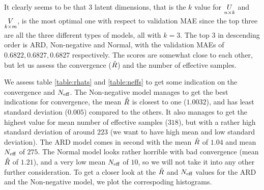 \documentclass[12pt]{article}
\begin{document}
    It clearly seems to be that $3$ latent dimensions, that is the $k$ value for $\underset{n \times k}{U}$ and $\underset{k \times m}{V}$, is the most optimal one with respect to validation MAE since the top three are all the three different types of models, all with $k=3$. The top 3 in descending order is ARD, Non-negative and Normal, with the validation MAEs of $0.6822, 0.6827, 0.6827$ respectively. The scores are somewhat close to each other, but let us assess the convergence ($\hat{R}$) and the number of effective samples. 

    \vspace{3mm}
    We assess table \ref{table:rhats} and \ref{table:neffs} to get some indication on the convergence and $N_{\text{eff}}$. The Non-negative model manages to get the best indications for convergence, the mean $\hat{R}$ is closest to one ($1.0032$), and has least standard deviation ($0.005$) compared to the others. It also manages to get the highest value for mean number of effective samples ($318$), but with a rather high standard deviation of around $223$ (we want to have high mean and low standard deviation). The ARD model comes in second with the mean $\hat{R}$ of $1.04$ and mean $N_{\text{eff}}$ of $275$. The Normal model looks rather horrible with bad convergence (mean $\hat{R}$ of $1.21$), and a very low mean $N_{\text{eff}}$ of $10$, so we will not take it into any other further consideration. To get a closer look at the $\hat{R}$ and $N_{\text{eff}}$ values for the ARD and the Non-negative model, we plot the correspoding histograms.
\end{document}
